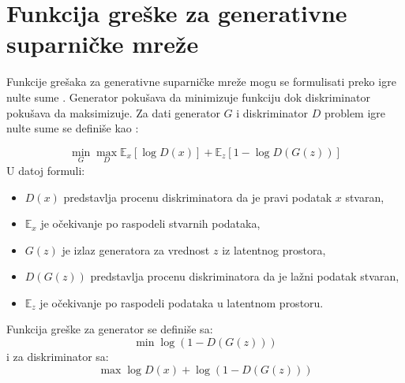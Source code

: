 \documentclass[12pt,oneside]{memoir}
\begin{document}
\section{Funkcija greške za generativne suparničke mreže}
Funkcije grešaka za generativne suparničke mreže mogu se formulisati preko igre nulte sume \cite{goodfellow2020generative, hodgson2006microeconomics}. Generator pokušava da minimizuje funkciju dok diskriminator pokušava da maksimizuje. Za dati generator $G$ i diskriminator $D$ problem igre nulte sume se definiše kao \cite{goodfellow2020generative, ml2019}:

\begin{equation}
   \min_{G}\max_{D}\mathbb{E}_{x}[\log{D(x)}] +  \mathbb{E}_{z}[1 - \log{D(G(z))}]
\end{equation}
U datoj formuli:
\begin{itemize}
    \item $D(x)$ predstavlja procenu diskriminatora da je pravi podatak $x$ stvaran,
    \item $\mathbb{E}_{x}$ je očekivanje po raspodeli stvarnih podataka,
    \item $G(z)$ je izlaz generatora za vrednost $z$ iz latentnog prostora,
    \item $D(G(z))$ predstavlja procenu diskriminatora da je lažni podatak stvaran,
    \item $\mathbb{E}_{z}$ je očekivanje po raspodeli podataka u latentnom prostoru.
\end{itemize}

\noindent Funkcija greške za generator se definiše sa:
\begin{equation}
\label{eq:generator}
    \min\log{(1-D(G(z)))}
\end{equation}
i za diskriminator sa:
\begin{equation}
\label{eq:discriminator}
    \max\log{D(x)}+\log{(1-D(G(z)))}
\end{equation}

\end{document}

